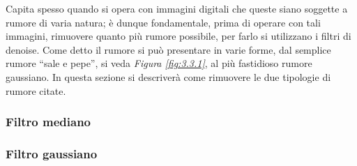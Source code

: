 \documentclass{subfiles}
\begin{document}
Capita spesso quando si opera con immagini digitali che queste siano soggette a rumore di varia natura;
è dunque fondamentale, prima di operare con tali immagini, rimuovere quanto più rumore possibile, per farlo si utilizzano i filtri di denoise.
Come detto il rumore si può presentare in varie forme, dal semplice rumore ``sale e pepe'', si veda \emph{Figura \ref{fig:3.3.1}}, al più fastidioso rumore gaussiano.
In questa sezione si descriverà come rimuovere le due tipologie di rumore citate.

\subsubsection{Filtro mediano}


\subsubsection{Filtro gaussiano}

\end{document}
